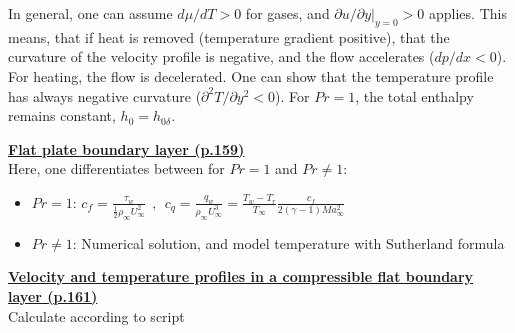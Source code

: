 \documentclass[8pt, landscape, fleqn]{scrartcl}
\begin{document}
\begin{multicols*}{3}
In general, one can assume $d\mu / dT > 0$ for gases, and $\partial u / \partial y |_{y=0} > 0$ applies. This means, that if heat is removed (temperature gradient positive), that the curvature of the velocity profile is negative, and the flow accelerates ($dp/dx < 0$). For heating, the flow is decelerated. One can show that the temperature profile has always negative curvature ($\partial^2 T / \partial y^2 < 0$). For $Pr = 1$, the total enthalpy remains constant, $h_0 = h_{0\delta}$.

\underline{\textbf{Flat plate boundary layer (p.159)}}\\
Here, one differentiates between for $Pr = 1$ and $Pr \neq 1$:
\begin{itemize}
    \item $Pr = 1$: $c_f = \frac{\tau_w}{\frac{1}{2}\rho_\infty U_\infty^2}~~,~~c_q = \frac{q_w}{\rho_\infty U_\infty^3} = \frac{T_w-T_r}{T_\infty}\frac{c_f}{2(\gamma-1)Ma_\infty^2}$
    \item $Pr \neq 1$: Numerical solution, and model temperature with Sutherland formula
\end{itemize}
\underline{\textbf{Velocity and temperature profiles in a compressible flat boundary layer (p.161)}}\\
Calculate according to script


\end{multicols*}
\end{document}
